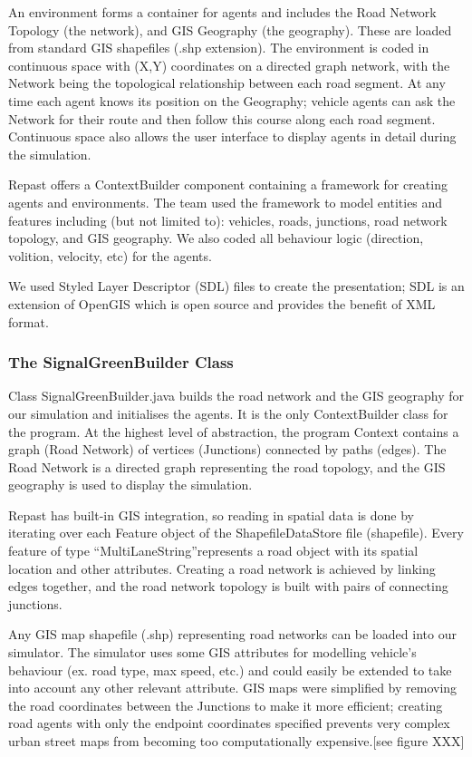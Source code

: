 \documentclass[11pt]{article}
\begin{document}
An environment forms a container for agents and includes the Road Network Topology (the network), and GIS Geography (the geography). These are loaded from standard GIS shapefiles (.shp extension). The environment is coded in continuous space with (X,Y) coordinates on a directed graph network, with the Network being the topological relationship between each road segment. At any time each agent knows its position on the Geography; vehicle agents can ask the Network for their route and then follow this course along each road segment. Continuous space also allows the user interface to display agents in detail during the simulation.

Repast offers a ContextBuilder component containing a framework for creating agents and environments. The team used the framework to model entities and features including (but not limited to): vehicles, roads, junctions, road network topology, and GIS geography. We also coded all behaviour logic (direction, volition, velocity, etc) for the agents.

We used Styled Layer Descriptor (SDL) files to create the presentation; SDL is an extension of OpenGIS which is open source and provides the benefit of XML format.


\subsubsection{The SignalGreenBuilder Class}


Class SignalGreenBuilder.java builds the road network and the GIS geography for our simulation and initialises the agents. It is the only ContextBuilder class for the program. At the highest level of abstraction, the program Context contains a graph (Road Network) of vertices (Junctions) connected by paths (edges). The Road Network is a directed graph representing the road topology, and the GIS geography is used to display the simulation. 

Repast has built-in GIS integration, so reading in spatial data is done by iterating over each Feature object of the ShapefileDataStore file (shapefile). Every feature of type \textquotedblleft MultiLaneString\textquotedblright represents a road object with its spatial location and other attributes. Creating a road network is achieved by linking edges together, and the road network topology is built with pairs of connecting junctions.

Any GIS map shapefile (.shp) representing road networks can be loaded into our simulator. The simulator uses some GIS attributes for modelling vehicle\textquoteright s behaviour (ex. road type, max speed, etc.) and could easily be extended to take into account any other relevant attribute.
GIS maps were simplified by removing the road coordinates between the Junctions to make it more efficient; creating road agents with only the endpoint coordinates specified prevents very complex urban street maps from becoming too computationally expensive.[see figure XXX] 
\\
\end{document}
